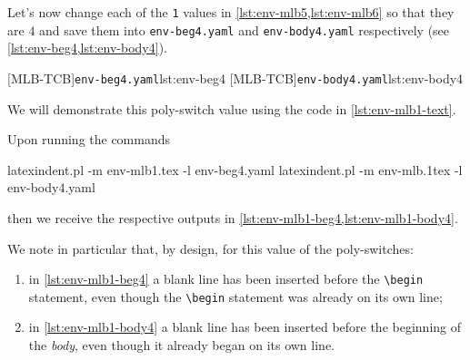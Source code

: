   \begin{example}
  Let's now change each of the \texttt{1} values in \cref{lst:env-mlb5,lst:env-mlb6} so
  that they are $4$ and save them into \texttt{env-beg4.yaml} and \texttt{env-body4.yaml}
  respectively (see \cref{lst:env-beg4,lst:env-body4}).  

  \begin{cmhtcbraster}
   [MLB-TCB]{\texttt{env-beg4.yaml}}{lst:env-beg4}
   [MLB-TCB]{\texttt{env-body4.yaml}}{lst:env-body4}
  \end{cmhtcbraster}

  We will demonstrate this poly-switch value using the code in \cref{lst:env-mlb1-text}.


  Upon running the commands  

  \begin{commandshell}
latexindent.pl -m env-mlb1.tex -l env-beg4.yaml
latexindent.pl -m env-mlb.1tex -l env-body4.yaml
\end{commandshell}

  then we receive the respective outputs in \cref{lst:env-mlb1-beg4,lst:env-mlb1-body4}.

  \begin{cmhtcbraster}[raster column skip=.1\linewidth]
  \end{cmhtcbraster}

  We note in particular that, by design, for this value of the poly-switches:
  \begin{enumerate}
   \item in \cref{lst:env-mlb1-beg4} a blank line has been inserted before the \lstinline!\begin!
         statement, even though the \lstinline!\begin! statement was already on its own line;
   \item in \cref{lst:env-mlb1-body4} a blank line has been inserted before the beginning of the
         \emph{body}, even though it already began on its own line.
  \end{enumerate}
  \end{example}

